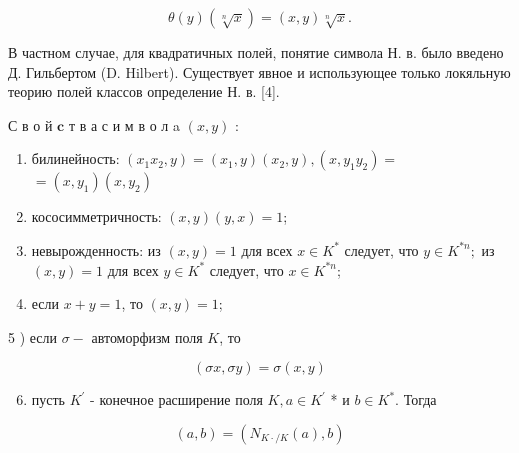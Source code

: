 \documentclass[10pt]{article}
\begin{document}
\[

\theta(y)(\sqrt[n]{x})=(x, y) \sqrt[n]{x} .

\]



В частном случае, для квадратичных полей, понятие символа Н. в. было введено Д. Гильбертом (D. Hilbert). Существует явное и использующее только локяльную теорию полей классов определение Н. в. [4].



С в о й $\mathbf{c}$ т в а с и м в о л a $(x, y)$ :



\begin{enumerate}

  \item билинейность: $\left(x_{1} x_{2}, y\right)=\left(x_{1}, y\right)\left(x_{2}, y\right),\left(x, y_{1} y_{2}\right)=$ $=\left(x, y_{1}\right)\left(x, y_{2}\right)$



  \item кососимметричность: $(x, y)(y, x)=1$;



  \item невырожденность: из $(x, y)=1$ для всех $x \in K^{*}$ следует, что $y \in K^{* n} ;$ из $(x, y)=1$ для всех $y \in K^{*}$ следует, что $x \in K^{* n}$;



  \item если $x+y=1$, то $(x, y)=1$;



\end{enumerate}



5 ) если $\sigma-$ автоморфизм поля $K$, то



\[

(\sigma x, \sigma y)=\sigma(x, y)

\]



\begin{enumerate}

  \setcounter{enumi}{5}

  \item пусть $K^{\prime}$ - конечное расширение поля $K, a \in K^{\prime}$ * и $b \in K^{*}$. Тогда

\end{enumerate}



\[

(a, b)=\left(N_{K \cdot / K}(a), b\right)

\]
\end{document}
